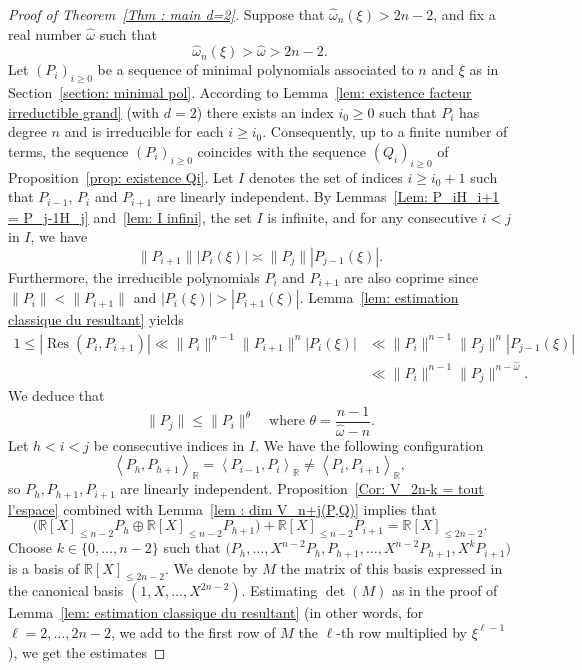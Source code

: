 \documentclass[JEP,XML,SOM,Unicode,NoFloatCountersInSection,published]{cedram}
\DeclareMathOperator\Res{Res}
\newcommand\bR{\mathbb{R}}
\newcommand\homega{\widehat{\omega}}\newcommand\HH{\mathcal{H}}
\newcommand{\normH}[1]{\|#1\|}
\newcommand{\Vect}[2][]{\left\la #2\right\ra_{#1}}
\let\la\langle
\let\ra\rangle
\theoremstyle{definition}
\theoremstyle{plain}
\begin{document}
\begin{proof}[Proof of Theorem~\ref{Thm : main d=2}]
Suppose that $\homega_n(\xi) > 2n-2$, and fix a real number $\homega$ such that
\[
\homega_n(\xi) > \homega > 2n-2.
\]
Let $(P_i)_{i\geq 0}$ be a sequence of minimal polynomials associated to $n$ and $\xi$ as in Section~\ref{section: minimal pol}. According to Lemma~\ref{lem: existence facteur irreductible grand} (with $d=2$) there exists an index $i_0\geq 0$ such that $P_i$ has degree $n$ and is irreducible for each $i\geq i_0$. Consequently, up to a finite number of terms, the sequence $(P_i)_{i\geq 0}$ coincides with the sequence $(Q_i)_{i\geq 0}$ of Proposition~\ref{prop: existence Qi}. Let $I$ denotes the set of indices $i\geq i_0+1$ such that $P_{i-1}$, $P_i$ and $P_{i+1}$ are linearly independent. By Lemmas~\ref{Lem: P_iH_i+1 = P_j-1H_j} and~\ref{lem: I infini}, the set $I$ is infinite, and for any consecutive $i<j$ in $I$, we have
\[
\normH{P_{i+1}}|P_i(\xi)| \asymp \normH{P_j}|P_{j-1}(\xi)|.
\]
Furthermore, the irreducible polynomials $P_i$ and $P_{i+1}$ are also coprime since $\normH{P_i} < \normH{P_{i+1}}$ and $|P_i(\xi)| > |P_{i+1}(\xi)|$. Lemma~\ref{lem: estimation classique du resultant} yields
\begin{align*}
1 \leq |\Res(P_i,P_{i+1})| \ll \normH{P_i}^{n-1}\normH{P_{i+1}}^n|P_{i}(\xi)| &\ll \normH{P_i}^{n-1}\normH{P_{j}}^n|P_{j-1}(\xi)| \\
& \ll \normH{P_i}^{n-1}\normH{P_{j}}^{n-\homega}.
\end{align*}
We deduce that
\begin{equation}
\label{eq proof: estimation theta}
\normH{P_{j}} \leq \normH{P_i}^\theta \quad \textrm{where } \theta = \frac{n-1}{\homega-n}.
\end{equation}
Let $h<i<j$ be consecutive indices in $I$. We have the following configuration
\[
\Vect[\bR]{P_h,P_{h+1}} = \Vect[\bR]{P_{i-1},P_{i}} \neq \Vect[\bR]{P_{i},P_{i+1}},
\]
so $P_{h}, P_{h+1}, P_{i+1}$ are linearly independent. Proposition~\ref{Cor: V_2n-k = tout l'espace} combined with Lemma~\ref{lem : dim V_n+j(P,Q)} implies that
\begin{equation*}
\Big(\bR[X]_{\leq n-2}P_{h}\oplus \bR[X]_{\leq n-2}P_{h+1}\Big) + \bR[X]_{\leq n-2}P_{i+1} = \bR[X]_{\leq 2n-2}.
\end{equation*}
Choose $k\in\{0,\dots,n-2\}$ such that $\big(P_{h},\dots,X^{n-2}P_{h},P_{h+1},\dots,X^{n-2}P_{h+1}, X^kP_{i+1}\big)$ is a basis of $\bR[X]_{\leq 2n-2}$. We denote by $M$ the matrix of this basis expressed in the canonical basis $(1,X,\dots,X^{2n-2})$. Estimating $\det(M)$ as in the proof of Lemma~\ref{lem: estimation classique du resultant} (in other words, for $\ell=2,\dots,2n-2$, we add to the first row of $M$ the $\ell$-th row multiplied by $\xi^{\ell-1}$), we get the estimates

\end{proof}
\end{document}
